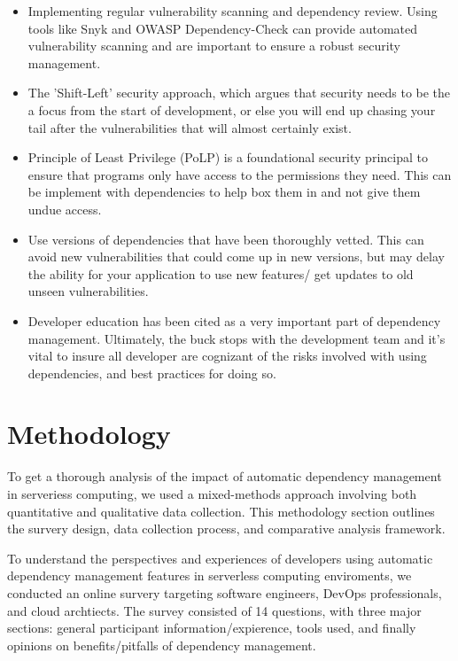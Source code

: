 \documentclass[sigconf]{acmart}
\begin{document}
\begin{itemize}
	\item Implementing regular vulnerability scanning and dependency review. Using tools like Snyk and OWASP Dependency-Check can provide automated vulnerability scanning and are important to ensure a robust security management.
	\item The 'Shift-Left' security approach, which argues that security needs to be the a focus from the start of development, or else you will end up chasing your tail after the vulnerabilities that will almost certainly exist. 
	\item Principle of Least Privilege (PoLP) is a foundational security principal to ensure that programs only have access to the permissions they need. This can be implement with dependencies to help box them in and not give them undue access. 
	\item Use versions of dependencies that have been thoroughly vetted. This can avoid new vulnerabilities that could come up in new versions, but may delay the ability for your application to use new features/ get updates to old unseen vulnerabilities. 
	\item Developer education has been cited as a very important part of dependency management. Ultimately, the buck stops with the development team and it's vital to insure all developer are cognizant of the risks involved with using dependencies, and best practices for doing so. 
	
\end{itemize}

\section{Methodology}

To get a thorough analysis of the impact of automatic dependency management in serveriess computing, we used a mixed-methods approach involving both quantitative and qualitative data collection. This methodology section outlines the survery design, data collection process, and comparative analysis framework. 

To understand the perspectives and experiences of developers using automatic dependency management features in serverless computing enviroments, we conducted an online survery targeting software engineers, DevOps professionals, and cloud archtiects. The survey consisted of 14 questions, with three major sections: general participant information/expierence, tools used, and finally opinions on benefits/pitfalls of dependency management.
\end{document}
